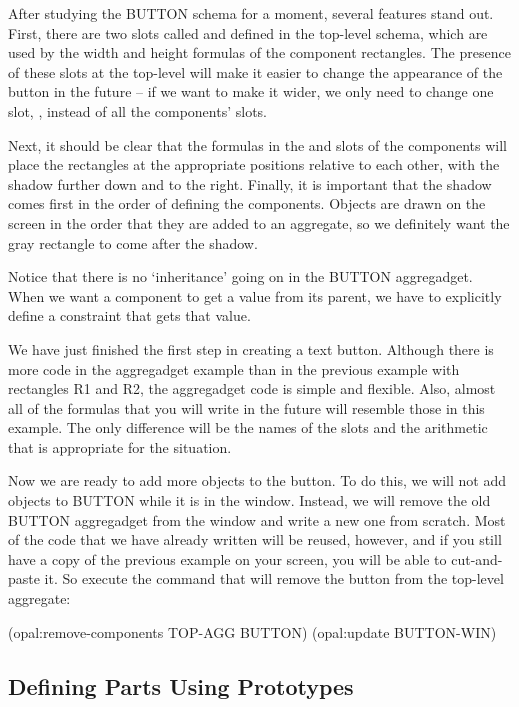 After studying the BUTTON schema for a moment, several features stand out.
First, there are two slots called  and
 defined in the top-level schema, which are used by
the width and height formulas of the component rectangles.  The
presence of these slots at the top-level will make it easier to change
the appearance of the button in the future -- if we want to make it
wider, we only need to change one slot, , instead
of all the components'  slots.

Next, it should be clear that the formulas in the  and
 slots of the components will place the rectangles at the
appropriate positions relative to each other, with the shadow further
down and to the right.  Finally, it is important that the shadow comes
first in the order of defining the components.  Objects are drawn on
the screen in the order that they are added to an aggregate, so we
definitely want the gray rectangle to come after the shadow.

Notice that there is no `inheritance' going on in the BUTTON
aggregadget.  When we want a component to get a value from its parent,
we have to explicitly define a constraint that gets that value.

We have just finished the first step in creating a text button.
Although there is more code in the aggregadget example than in the
previous example with rectangles R1 and R2, the aggregadget code is
simple and flexible.  Also, almost all of the formulas that you will
write in the future will resemble those in this example.  The only
difference will be the names of the slots and the arithmetic that is
appropriate for the situation.

Now we are ready to add more objects to the button.  To do this, we will
not add objects to BUTTON while it is in the window.  Instead, we will
remove the old BUTTON aggregadget from the window and write a new one from
scratch.  Most of the code that we have already written will be reused,
however, and if you still have a copy of the previous example on your screen,
you will be able to cut-and-paste it.  So execute the command that
will remove the button from the top-level aggregate:

\begin{programexample}
(opal:remove-components TOP-AGG BUTTON)
(opal:update BUTTON-WIN)
\end{programexample}


\subsection{Defining Parts Using Prototypes}

